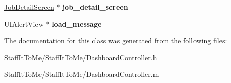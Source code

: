 \begin{DoxyCompactItemize}
\item 
\hypertarget{interface_dashboard_controller_a11daec2778872efe1776971a0243e331}{
\hyperlink{interface_job_detail_screen}{\-Job\-Detail\-Screen} $\ast$ {\bfseries job\-\_\-detail\-\_\-screen}}
\label{interface_dashboard_controller_a11daec2778872efe1776971a0243e331}

\item 
\hypertarget{interface_dashboard_controller_a5544de9c2415b796410d24b4e76fd7c4}{
\-U\-I\-Alert\-View $\ast$ {\bfseries load\-\_\-message}}
\label{interface_dashboard_controller_a5544de9c2415b796410d24b4e76fd7c4}

\end{DoxyCompactItemize}


\-The documentation for this class was generated from the following files\-:\begin{DoxyCompactItemize}
\item 
\-Staff\-It\-To\-Me/\-Staff\-It\-To\-Me/\-Dashboard\-Controller.\-h\item 
\-Staff\-It\-To\-Me/\-Staff\-It\-To\-Me/\-Dashboard\-Controller.\-m\end{DoxyCompactItemize}
